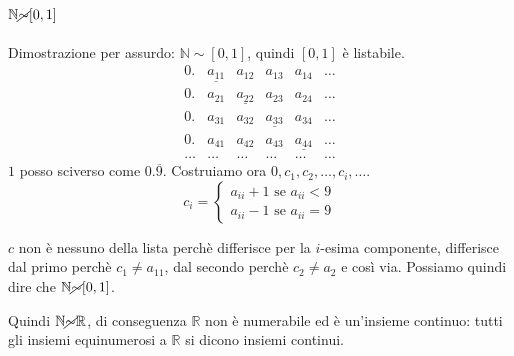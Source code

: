 \documentclass{article}
\begin{document}
\paragraph{$\mathbb{N} \cancel{\sim} [0,1]$}
Dimostrazione per assurdo: $\mathbb{N} {\sim} [0,1]$, quindi $[0,1]$ è listabile.
\begin{displaymath}
\begin{matrix}
0. & \underline{a_{11}} & a_{12} & a_{13} & a_{14} & \dots \\
0. & a_{21} & \underline{a_{22}} & a_{23} & a_{24} & \dots \\
0. & a_{31} & a_{32} & \underline{a_{33}} & a_{34} & \dots \\
0. & a_{41} & a_{42} & a_{43} & \underline{a_{44}} & \dots \\
\dots & \dots & \dots & \dots  & \dots & \dots
\end{matrix}
\end{displaymath}
$1$ posso sciverso come $0.\overline{9}$. Costruiamo ora $0, c_{1},c_{2},\dots,c_{i},\dots$.
\begin{displaymath}
c_i=
\begin{cases}
	a_{ii}+1 \text{ se } a_{ii} < 9 \\
	a_{ii}-1 \text{ se } a_{ii} = 9 
\end{cases}
\end{displaymath}

$c$ non è nessuno della lista perchè differisce per la $i$-esima componente, differisce dal primo perchè $c_1 \neq a_{11}$, dal secondo perchè $c_2 \neq a_{2}$ e così via.
Possiamo quindi dire che $\mathbb{N} \cancel{\sim} [0,1]$.


\noindent
Quindi $\mathbb{N} \cancel{\sim} \mathbb{R}$, di conseguenza $\mathbb{R}$ non è numerabile ed è un'insieme continuo: tutti gli insiemi equinumerosi a $\mathbb{R}$ si dicono insiemi continui.
\end{document}
